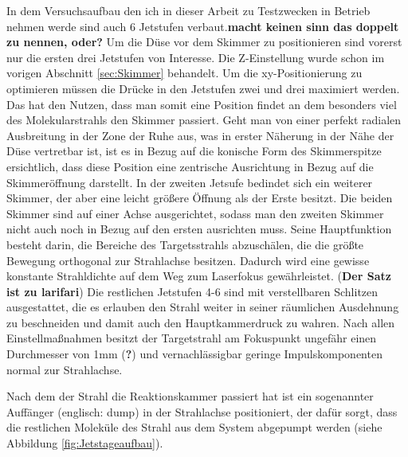 In dem Versuchsaufbau den ich in dieser Arbeit zu Testzwecken in Betrieb nehmen werde sind auch 6 Jetstufen verbaut.\textbf{macht keinen sinn das doppelt zu nennen, oder?}
Um die Düse vor dem Skimmer zu positionieren sind vorerst nur die ersten drei Jetstufen von Interesse. Die Z-Einstellung wurde schon im vorigen Abschnitt \ref{sec:Skimmer} behandelt. Um die xy-Positionierung zu optimieren müssen die Drücke in den Jetstufen zwei und drei maximiert werden. Das hat den Nutzen, dass man somit eine Position findet an dem besonders viel des Molekularstrahls den Skimmer passiert. Geht man von einer perfekt radialen Ausbreitung in der Zone der Ruhe aus, was in erster Näherung in der Nähe der Düse vertretbar ist, ist es in Bezug auf die konische Form des Skimmerspitze ersichtlich, dass diese Position eine zentrische Ausrichtung in Bezug auf die Skimmeröffnung darstellt. 
In der zweiten Jetsufe bedindet sich ein weiterer Skimmer, der aber eine leicht größere Öffnung als der Erste besitzt. Die beiden Skimmer sind auf einer Achse ausgerichtet, sodass man den zweiten Skimmer nicht auch noch in Bezug auf den ersten ausrichten muss. Seine Hauptfunktion besteht darin, die Bereiche des Targetsstrahls abzuschälen, die die größte Bewegung orthogonal zur Strahlachse besitzen. Dadurch wird eine gewisse konstante Strahldichte auf dem Weg zum Laserfokus gewährleistet. (\textbf{Der Satz ist zu larifari}) 
Die restlichen Jetstufen 4-6 sind mit verstellbaren Schlitzen ausgestattet, die es erlauben den Strahl weiter in seiner räumlichen Ausdehnung zu beschneiden und damit auch den Hauptkammerdruck zu wahren. Nach allen Einstellmaßnahmen besitzt der Targetstrahl am Fokuspunkt ungefähr einen Durchmesser von 1mm (\textbf{?}) und vernachlässigbar geringe Impulskomponenten normal zur Strahlachse.

Nach dem der Strahl die Reaktionskammer passiert hat ist ein sogenannter Auffänger (englisch: dump) in der Strahlachse positioniert, der dafür sorgt, dass die restlichen Moleküle des Strahl aus dem System abgepumpt werden (siehe Abbildung \ref{fig:Jetstageaufbau}).


%
%
%
%
%
%
